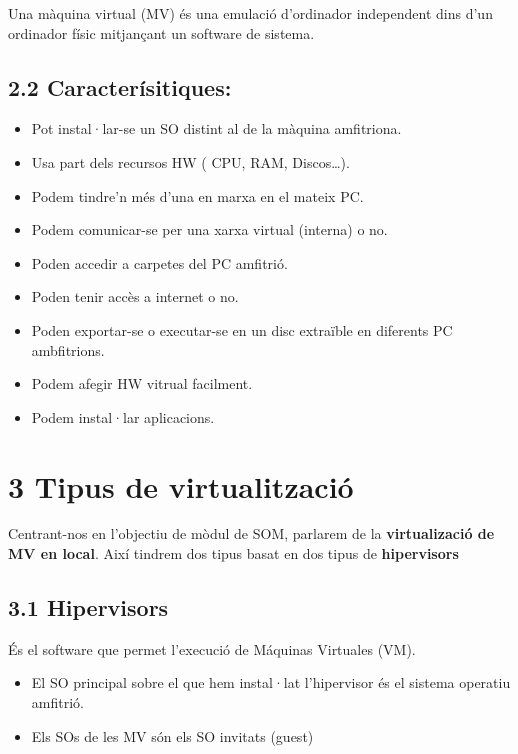 \documentclass[
  spanish,
  12 pt,
  a4paper,
]{article}
\providecommand{\tightlist}{%
  \setlength{\itemsep}{0pt}\setlength{\parskip}{0pt}}
\begin{document}
Una màquina virtual (MV) és una emulació d'ordinador independent dins
d'un ordinador físic mitjançant un software de sistema.

\subsection{2.2 Caracterísitiques:}\label{caracteruxedsitiques}

\begin{itemize}
\tightlist
\item
  Pot instal·lar-se un SO distint al de la màquina amfitriona.
\item
  Usa part dels recursos HW ( CPU, RAM, Discos\ldots).
\item
  Podem tindre'n més d'una en marxa en el mateix PC.
\item
  Podem comunicar-se per una xarxa virtual (interna) o no.
\item
  Poden accedir a carpetes del PC amfitrió.
\item
  Poden tenir accès a internet o no.
\item
  Poden exportar-se o executar-se en un disc extraïble en diferents PC
  ambfitrions.
\item
  Podem afegir HW vitrual facilment.
\item
  Podem instal·lar aplicacions.
\end{itemize}

\section{3 Tipus de virtualització}\label{tipus-de-virtualitzaciuxf3}

Centrant-nos en l'objectiu de mòdul de SOM, parlarem de la
\textbf{virtualizació de MV en local}. Així tindrem dos tipus basat en
dos tipus de \textbf{hipervisors}

\subsection{3.1 Hipervisors}\label{hipervisors}

És el software que permet l'execució de Máquinas Virtuales (VM).

\begin{itemize}
\item
  El SO principal sobre el que hem instal·lat l'hipervisor és el sistema
  operatiu amfitrió.
\item
  Els SOs de les MV són els SO invitats (guest)
\end{itemize}
\end{document}
